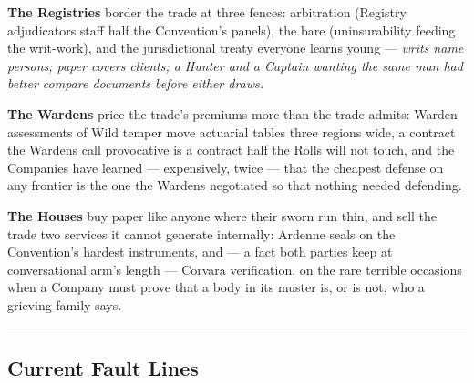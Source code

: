 \textbf{The Registries} border the trade at three fences: arbitration (Registry adjudicators staff half the Convention's panels), the bare (uninsurability feeding the writ-work), and the jurisdictional treaty everyone learns young --- \textit{writs name persons; paper covers clients; a Hunter and a Captain wanting the same man had better compare documents before either draws.}

\textbf{The Wardens} price the trade's premiums more than the trade admits: Warden assessments of Wild temper move actuarial tables three regions wide, a contract the Wardens call provocative is a contract half the Rolls will not touch, and the Companies have learned --- expensively, twice --- that the cheapest defense on any frontier is the one the Wardens negotiated so that nothing needed defending.

\textbf{The Houses} buy paper like anyone where their sworn run thin, and sell the trade two services it cannot generate internally: Ardenne seals on the Convention's hardest instruments, and --- a fact both parties keep at conversational arm's length --- Corvara verification, on the rare terrible occasions when a Company must prove that a body in its muster is, or is not, who a grieving family says.

\medskip\hrule\medskip

\subsection{Current Fault Lines}

